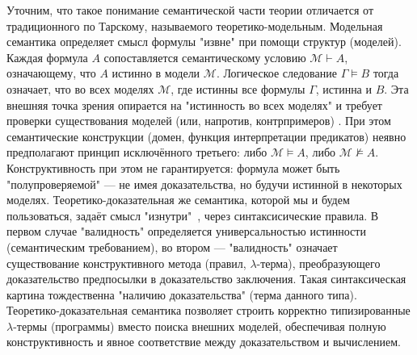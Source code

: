 \documentclass[14pt]{extarticle}
\begin{document}
	Уточним, что такое понимание семантической части теории отличается от традиционного по Тарскому, называемого теоретико-модельным. Модельная семантика определяет смысл формулы "извне" при помощи структур (моделей). Каждая формула \(A\) сопоставляется семантическому условию \(\mathcal{M}\vdash A\), означающему, что \(A\) истинно в модели \(\mathcal{M}\). Логическое следование \(\Gamma\models B\) тогда означает, что во всех моделях \(\mathcal{M}\), где истинны все формулы \(\Gamma\), истинна и \(B\). Эта внешняя точка зрения опирается на "истинность во всех моделях" и требует проверки существования моделей (или, напротив, контрпримеров) \cite[27]{Schroeder-Heister2024}. При этом семантические конструкции (домен, функция интерпретации предикатов) неявно предполагают принцип исключённого третьего: либо \(\mathcal{M}\models A\), либо \(\mathcal{M}\not\models A\). Конструктивность при этом не гарантируется: формула может быть "полупроверяемой" — не имея доказательства, но будучи истинной в некоторых моделях.	Теоретико-доказательная же семантика, которой мы и будем пользоваться, задаёт смысл "изнутри"\  , через синтаксисические правила. В первом случае "валидность" определяется универсальностью истинности (семантическим требованием), во втором — "валидность" означает существование конструктивного метода (правил, \(\lambda\)-терма), преобразующего доказательство предпосылки в доказательство заключения. Такая синтаксическая картина тождественна "наличию доказательства" (терма данного типа). Теоретико-доказательная семантика позволяет строить корректно типизированные \(\lambda\)-термы (программы) вместо поиска внешних моделей, обеспечивая полную конструктивность и явное соответствие между доказательством и вычислением. 
	
\end{document}
